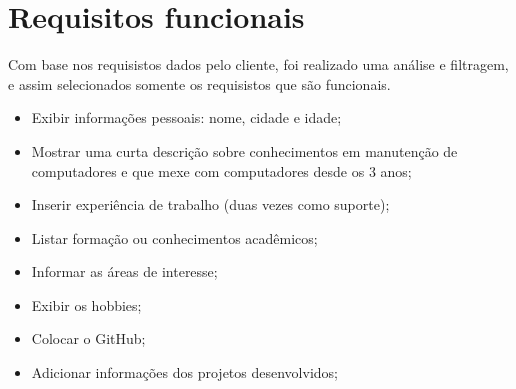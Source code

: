 \section{Requisitos funcionais}
 Com base nos requisistos dados pelo cliente, foi realizado uma análise e filtragem, e assim selecionados somente os requisistos que são funcionais.
 \begin{itemize}
    \item Exibir informações pessoais: nome, cidade e idade;
    \item Mostrar uma curta descrição sobre conhecimentos em manutenção de computadores e que mexe com computadores desde os 3 anos;
    \item Inserir experiência de trabalho (duas vezes como suporte);
    \item Listar formação ou conhecimentos acadêmicos;
    \item Informar as áreas de interesse;
    \item Exibir os hobbies;
    \item Colocar o GitHub;
    \item Adicionar informações dos projetos desenvolvidos;
 \end{itemize}




 


 

 
 

 

